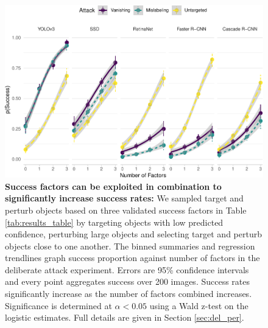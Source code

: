 \begin{figure}[tb]

{\centering \includegraphics[width=1\linewidth]{imgs/biased_trend_graph} 

}

\caption{\textbf{Success factors can be exploited in combination to significantly increase success rates:}  We sampled target and perturb objects based on three validated success factors in Table \ref{tab:results_table} by targeting objects with low predicted confidence, perturbing large objects and selecting target and perturb objects close to one another. The binned summaries and regression trendlines graph success proportion against number of factors in the deliberate attack experiment. Errors are 95\% confidence intervals and every point aggregates success over 200 images. Success rates significantly increase as the number of factors combined increases. Significance is determined at $\alpha < 0.05$ using a Wald z-test on the logistic estimates. Full details are given in Section \ref{sec:del_per}.}\label{fig:biased_trend_graph}
\end{figure}